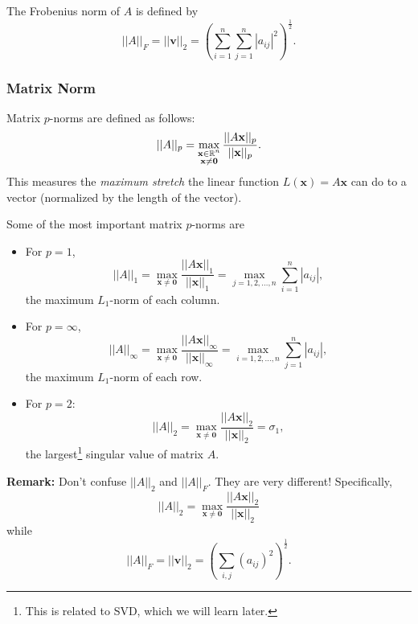 \documentclass[letterpaper]{article}
\newcommand{\0}{\mathbf{0}}
\newcommand{\x}{\mathbf{x}}
\newcommand{\vv}{\mathbf{v}}
\begin{document}
The Frobenius norm of $A$ is defined by 
\[||A||_F = ||\vv||_2 = \left(\sum_{i = 1}^{n} \sum_{j = 1}^{n} |a_{ij}|^2\right)^{\frac{1}{2}}.\]

\subsubsection{Matrix Norm}
Matrix $p$-norms are defined as follows: 
\[||A||_p = \max_{\substack{\x \in \R^n \\ \x \neq \0}} \frac{||A\x||_p}{||\x||_p}.\]
This measures the \emph{maximum stretch} the linear function $L(\x) = A\x$ can do to a vector (normalized by the length of the vector).

\bigskip 

Some of the most important matrix $p$-norms are 
\begin{itemize}
    \item For $p = 1$, \[||A||_1 = \max_{\x \neq \0} \frac{||A\x||_1}{||\x||_1} = \max_{j = 1, 2, \hdots, n} \sum_{i = 1}^{n} |a_{ij}|,\] the maximum $L_1$-norm of each column.
    \item For $p = \infty$, \[||A||_\infty = \max_{\x \neq \0} \frac{||A\x||_\infty}{||\x||_\infty} = \max_{i = 1, 2, \hdots, n} \sum_{j = 1}^{n} |a_{ij}|,\] the maximum $L_1$-norm of each row.
    \item For $p = 2$: \[||A||_2 = \max_{\x \neq \0} \frac{||A\x||_2}{||\x||_2} = \sigma_1,\] the largest\footnote{This is related to SVD, which we will learn later.} singular value of matrix $A$.
\end{itemize}
\textbf{Remark:} Don't confuse $||A||_2$ and $||A||_F$. They are very different! Specifically, 
\[||A||_2 = \max_{\x \neq \0} \frac{||A\x||_2}{||\x||_2}\]
while 
\[||A||_F = ||\vv||_2 = \left(\sum_{i, j} (a_{ij})^2\right)^{\frac{1}{2}}.\]
\end{document}
